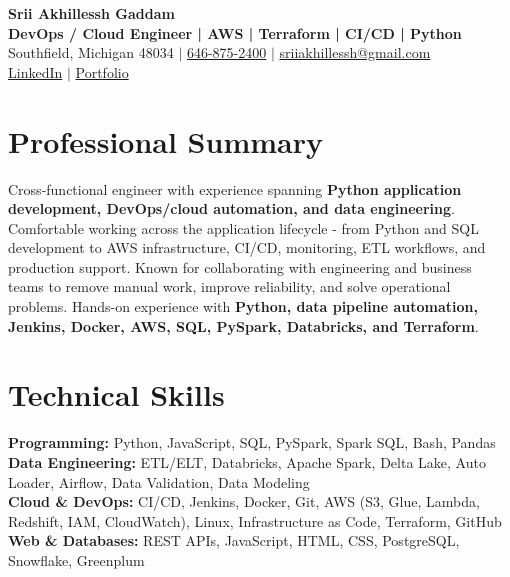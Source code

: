 \documentclass[letterpaper,10pt]{article}
\begin{document}
\fontsize{9.35pt}{10.45pt}\selectfont

\begin{center}
    {\LARGE \textbf{Srii Akhillessh Gaddam}} \\[-1pt]
    \textbf{DevOps / Cloud Engineer | AWS | Terraform | CI/CD | Python} \\[2pt]
    Southfield, Michigan 48034 $|$
    \href{tel:6468752400}{646-875-2400} $|$
    \href{mailto:sriiakhillessh@gmail.com}{sriiakhillessh@gmail.com} \\[1pt]
    \href{https://www.linkedin.com/in/srii-akhiilessh-gaddam-b48668191/}{LinkedIn} $|$
    \href{https://sriiakhillesshg.github.io/portfolio/}{Portfolio}
\end{center}
\vspace{-8pt}

\section{Professional Summary}
\small{Cross-functional engineer with experience spanning \textbf{Python application development, DevOps/cloud automation, and data engineering}. Comfortable working across the application lifecycle - from Python and SQL development to AWS infrastructure, CI/CD, monitoring, ETL workflows, and production support. Known for collaborating with engineering and business teams to remove manual work, improve reliability, and solve operational problems. Hands-on experience with \textbf{Python, data pipeline automation, Jenkins, Docker, AWS, SQL, PySpark, Databricks, and Terraform}.}

\section{Technical Skills}
\small{
\textbf{Programming:} Python, JavaScript, SQL, PySpark, Spark SQL, Bash, Pandas \\
\textbf{Data Engineering:} ETL/ELT, Databricks, Apache Spark, Delta Lake, Auto Loader, Airflow, Data Validation, Data Modeling \\
\textbf{Cloud \& DevOps:} CI/CD, Jenkins, Docker, Git, AWS (S3, Glue, Lambda, Redshift, IAM, CloudWatch), Linux, Infrastructure as Code, Terraform, GitHub \\
\textbf{Web \& Databases:} REST APIs, JavaScript, HTML, CSS, PostgreSQL, Snowflake, Greenplum
}
\end{document}
